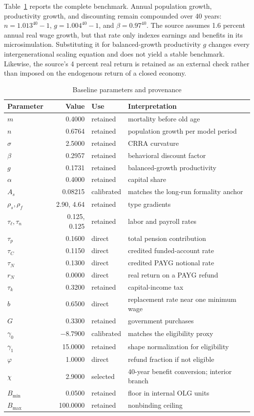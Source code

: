 \documentclass[12pt]{article}
\newcommand{\1}{\mathbf{1}}
\begin{document}
Table~\ref{tab:parameters} reports the complete benchmark. Annual population growth,
productivity growth, and discounting remain compounded over 40 years:
$n=1.013^{40}-1$, $g=1.004^{40}-1$, and $\beta=0.97^{40}$. The source assumes 1.6 percent
annual real wage growth, but that rate only indexes earnings and benefits in its
microsimulation. Substituting it for balanced-growth productivity $g$ changes every
intergenerational scaling equation and does not yield a stable benchmark. Likewise, the
source's 4 percent real return is retained as an external check rather than imposed on the
endogenous return of a closed economy.

\begin{table}[htbp]\centering
\scriptsize\setlength{\tabcolsep}{3.5pt}
\caption{Baseline parameters and provenance}\label{tab:parameters}
\begin{tabular}{lrlp{}}
\toprule Parameter&Value&Use&Interpretation\\ \midrule
$m$&0.4000&retained&mortality before old age\\
$n$&0.6764&retained&population growth per model period\\
$\sigma$&2.5000&retained&CRRA curvature\\
$\beta$&0.2957&retained&behavioral discount factor\\
$g$&0.1731&retained&balanced-growth productivity\\
$\alpha$&0.4000&retained&capital share\\
$A_s$&0.08215&calibrated&matches the long-run formality anchor\\
$\rho_s,\rho_f$&2.90, 4.64&retained&type gradients\\
$\tau_\ell,\tau_n$&0.125, 0.125&retained&labor and payroll rates\\
$\tau_p$&0.1600&direct&total pension contribution\\
$\tau_C$&0.1150&direct&credited funded-account rate\\
$\tau_N$&0.1300&direct&credited PAYG notional rate\\
$r_N$&0.0000&direct&real return on a PAYG refund\\
$\tau_k$&0.3200&retained&capital-income tax\\
$b$&0.6500&direct&replacement rate near one minimum wage\\
$G$&0.3300&retained&government purchases\\ \midrule
$\gamma_0$&$-8.7900$&calibrated&matches the eligibility proxy\\
$\gamma_1$&15.0000&retained&shape normalization for eligibility\\
$\varphi$&1.0000&direct&refund fraction if not eligible\\
$\chi$&2.9000&selected&40-year benefit conversion; interior branch\\
$B_{\min}$&0.0500&retained&floor in internal OLG units\\
$B_{\max}$&100.0000&retained&nonbinding ceiling\\ \bottomrule
\end{tabular}
\end{table}
\end{document}

